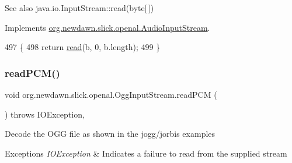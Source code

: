 \begin{DoxySeeAlso}{See also}
java.\+io.\+Input\+Stream\+::read(byte\mbox{[}$\,$\mbox{]}) 
\end{DoxySeeAlso}


Implements \mbox{\hyperlink{interfaceorg_1_1newdawn_1_1slick_1_1openal_1_1_audio_input_stream_a1e8c74e2bc52725377b2b859da92a4af}{org.\+newdawn.\+slick.\+openal.\+Audio\+Input\+Stream}}.


\begin{DoxyCode}
497                                                  \{
498         \textcolor{keywordflow}{return} \mbox{\hyperlink{classorg_1_1newdawn_1_1slick_1_1openal_1_1_ogg_input_stream_a66397cab8bce3c41ce7bcb4447a66a46}{read}}(b, 0, b.length);
499     \}
\end{DoxyCode}
\mbox{\label{classorg_1_1newdawn_1_1slick_1_1openal_1_1_ogg_input_stream_ac65475d928528fa2e69dee80131f29a8}} 
\subsubsection{\texorpdfstring{read\+P\+C\+M()}{readPCM()}}
{\footnotesize\ttfamily void org.\+newdawn.\+slick.\+openal.\+Ogg\+Input\+Stream.\+read\+P\+CM (\begin{DoxyParamCaption}{ }\end{DoxyParamCaption}) throws I\+O\+Exception\hspace{0.3cm}{\ttfamily [inline]}, {\ttfamily [private]}}

Decode the O\+GG file as shown in the jogg/jorbis examples


\begin{DoxyExceptions}{Exceptions}
{\em I\+O\+Exception} & Indicates a failure to read from the supplied stream \\
\hline
\end{DoxyExceptions}

